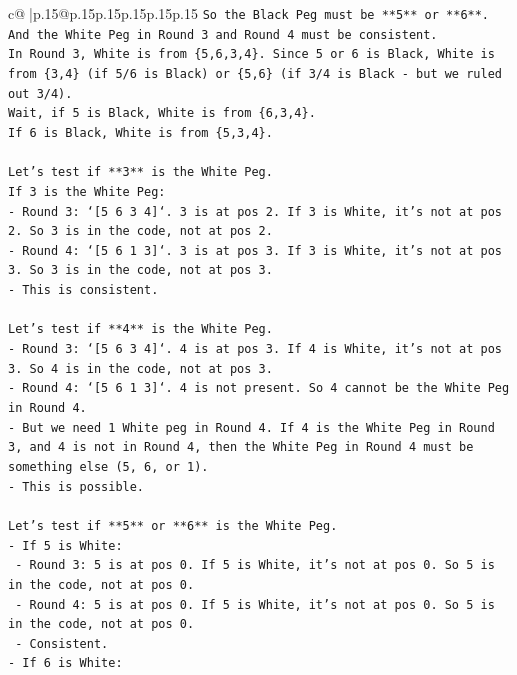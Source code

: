 \documentclass{article}
\begin{document}
{\begin{supertabular}{c@{$\;$}|p{.15\linewidth}@{}p{.15\linewidth}p{.15\linewidth}p{.15\linewidth}p{.15\linewidth}p{.15\linewidth}}
{{{\texttt{So the Black Peg must be **5** or **6**.} \\
\texttt{And the White Peg in Round 3 and Round 4 must be consistent.} \\
\texttt{In Round 3, White is from \{5,6,3,4\}. Since 5 or 6 is Black, White is from \{3,4\} (if 5/6 is Black) or \{5,6\} (if 3/4 is Black {-} but we ruled out 3/4).} \\
\texttt{Wait, if 5 is Black, White is from \{6,3,4\}.} \\
\texttt{If 6 is Black, White is from \{5,3,4\}.} \\
\\ 
\texttt{Let's test if **3** is the White Peg.} \\
\texttt{If 3 is the White Peg:} \\
\texttt{{-} Round 3: `{[}5 6 3 4{]}`. 3 is at pos 2. If 3 is White, it's not at pos 2. So 3 is in the code, not at pos 2.} \\
\texttt{{-} Round 4: `{[}5 6 1 3{]}`. 3 is at pos 3. If 3 is White, it's not at pos 3. So 3 is in the code, not at pos 3.} \\
\texttt{{-} This is consistent.} \\
\\ 
\texttt{Let's test if **4** is the White Peg.} \\
\texttt{{-} Round 3: `{[}5 6 3 4{]}`. 4 is at pos 3. If 4 is White, it's not at pos 3. So 4 is in the code, not at pos 3.} \\
\texttt{{-} Round 4: `{[}5 6 1 3{]}`. 4 is not present. So 4 cannot be the White Peg in Round 4.} \\
\texttt{{-} But we need 1 White peg in Round 4. If 4 is the White Peg in Round 3, and 4 is not in Round 4, then the White Peg in Round 4 must be something else (5, 6, or 1).} \\
\texttt{{-} This is possible.} \\
\\ 
\texttt{Let's test if **5** or **6** is the White Peg.} \\
\texttt{{-} If 5 is White:} \\
\texttt{    {-} Round 3: 5 is at pos 0. If 5 is White, it's not at pos 0. So 5 is in the code, not at pos 0.} \\
\texttt{    {-} Round 4: 5 is at pos 0. If 5 is White, it's not at pos 0. So 5 is in the code, not at pos 0.} \\
\texttt{    {-} Consistent.} \\
\texttt{{-} If 6 is White:} \\
}}}
\end{supertabular}}
\end{document}
